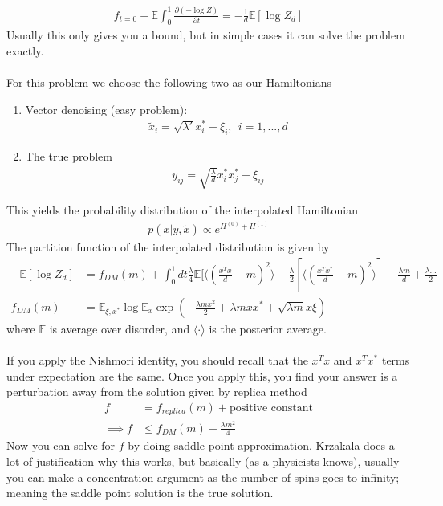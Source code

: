 \begin{align}
	f_{t=0} + \mathbb E \int _0^1 \frac{\partial(- \log Z)}{\partial t} = - \frac{1}{d} \mathbb E[\log Z_d]
\end{align}
Usually this only gives you a bound, but in simple cases it can solve the problem exactly.\\
\\
For this problem we choose the following two as our Hamiltonians
\begin{enumerate}
	\item Vector denoising (easy problem): 
	\begin{align}
		\tilde x_i = \sqrt{\lambda '} x_i^* + \xi_i, ~~ i=1,...,d
	\end{align}
	\item The true problem
	\begin{align}
		y_{ij} = \sqrt{\frac{\lambda}{d}} x_i^* x_j^* + \xi_{ij}
	\end{align}
\end{enumerate}
This yields the probability distribution of the interpolated Hamiltonian
\begin{align}
	p(x | y, \tilde x) \propto e^{H^{(0)} + H^{(1)}}
\end{align}
The partition function of the interpolated distribution is given by
\begin{align}
	- \mathbb E[\log Z_d] & = f_{DM} (m) + \int_0^1 dt  \frac{\lambda}{4} \mathbb E[ \langle (\frac{x^T x}{d} - m)^2 \rangle - \frac{\lambda}{2} [ \langle ( \frac{x^T x^*}{d} - m )^2 \rangle] - \frac{\lambda m}{d} + \frac{\lambda ...}{2}\\
	f_{DM}(m) & = \mathbb E_{\xi, x^*} \log \mathbb E_{x} \exp \left( - \frac{\lambda m x^2}{2} + \lambda m x x^* + \sqrt{\lambda m } x\xi \right)
\end{align}
where $\mathbb E$ is average over disorder, and $\langle \cdot \rangle$ is the posterior average.\\
\\
If you apply the Nishmori identity, you should recall that the $x^T x$ and $x^T x^*$ terms under expectation are the same. Once you apply this, you find your answer is a perturbation away from the solution given by replica method
\begin{align}
	f & = f_{replica}(m) + \text{positive constant} \\
	\implies f & \leq  f_{DM}(m) + \frac{\lambda m^2}{4}
\end{align}
Now you can solve for $f$ by doing saddle point approximation. Krzakala does a lot of justification why this works, but basically (as a physicists knows), usually you can make a concentration argument as the number of spins goes to infinity; meaning the saddle point solution is the true solution.


